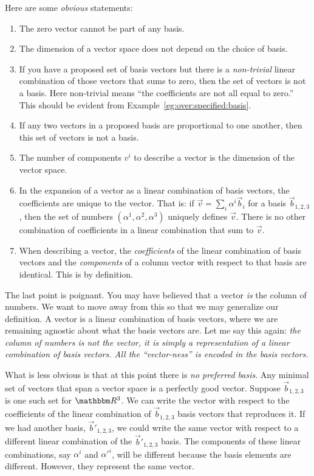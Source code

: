 Here are some \emph{obvious} statements:
\begin{enumerate}
    \item The zero vector cannot be part of any basis.
    \item The dimension of a vector space does not depend on the choice of basis.
    \item If you have a proposed set of basis vectors but there is a \emph{non-trivial} linear combination of those vectors that sums to zero, then the set of vectors is not a basis. Here non-trivial means ``the coefficients are not all equal to zero.'' This should be evident from Example~\ref{eg:over:specified:basis}.
    \item If any two vectors in a proposed basis are proportional to one another, then this set of vectors is not a basis.
    \item The number of components $v^i$ to describe a vector is the dimension of the vector space.
    \item In the expansion of a vector as a linear combination of basis vectors, the coefficients are unique to the vector. That is: if $\vec{v} = \sum_i \alpha^i\vec{b}_i$ for a basis $\vec{b}_{1,2,3}$, then the set of numbers $(\alpha^1, \alpha^2, \alpha^3)$ uniquely defines $\vec{v}$. There is no other combination of coefficients in a linear combination that sum to $\vec{v}$. 
    \item When describing a vector, the \emph{coefficients} of the linear combination of basis vectors and the \emph{components} of a column vector with respect to that basis are identical. This is by definition. 
\end{enumerate}
The last point is poignant. You may have believed that a vector \emph{is} the column of numbers. We want to move away from this so that we may generalize our definition. A vector is a linear combination of basis vectors, where we are remaining agnostic about what the basis vectors are. Let me say this again: \emph{the column of numbers is not the vector, it is simply a representation of a linear combination of basis vectors. All the ``vector-ness'' is encoded in the basis vectors.}




What is less obvious is that at this point there is \emph{no preferred basis}. Any minimal set of vectors that span a vector space is a perfectly good vector. Suppose $\vec{b}_{1,2,3}$ is one such set for $\RR ^3$. We can write the vector with respect to the coefficients of the linear combination of  $\vec{b}_{1,2,3}$ basis vectors that reproduces it. If we had another basis, $\vec{b}'_{1,2,3}$, we could write the same vector with respect to a different linear combination of the $\vec{b}'_{1,2,3}$ basis. The components of these linear combinations, say $\alpha^i$ and $\alpha'^i$, will be different because the basis elements are different. However, they represent the same vector.

